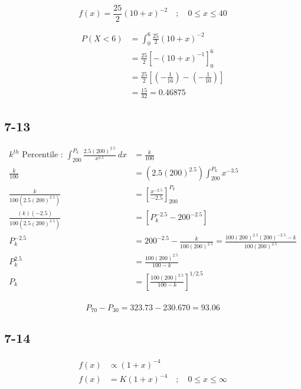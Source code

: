 \documentclass{article}
\begin{document}
			\[
				f(x) = \frac{25}{2} \left( 10 + x \right)^{-2} \quad ; \quad 0 \leq x \leq 40
			\]

			\begin{equation*}
				\begin{split}
					P(X < 6) &= \int_{0}^{6} \frac{25}{2} \left( 10 + x \right)^{-2} \\
					&= \frac{25}{2} \left[ -(10 + x)^{-1} \right]^{6}_0 \\
					&= \frac{25}{2} \left[ \left(-\frac{1}{16}\right) - \left(-\frac{1}{10}\right) \right] \\
					&= \frac{15}{32} = \boxed{\num{0.46875}}
				\end{split}
			\end{equation*}

		\subsection*{7-13}

			\begin{equation*}
				\begin{split}
					k^{th} \text{ Percentile : } \int_{200}^{P_{k}} \frac{2.5 (200)^{2.5}}{x^{3.5}} \ dx &= \frac{k}{100} \\
					\frac{k}{100} &= (2.5 (200)^{2.5}) \int_{200}^{P_{k}} x^{-3.5} \\
					\frac{k}{100(2.5 (200)^{2.5})} &= \left[ \frac{x^{-2.5}}{-2.5} \right]^{P_{k}}_{200} \\
					\frac{(k)(-2.5)}{100(2.5 (200)^{2.5})} &= \left[ P_{k}^{-2.5} - 200^{-2.5} \right] \\
					P_{k}^{-2.5} &= 200^{-2.5} - \frac{k}{100(200)^{2.5}} = \frac{100(200)^{2.5}(200)^{-2.5} - k}{100(200)^{2.5}} \\
					P_{k}^{2.5} &= \frac{100(200)^{2.5}}{100 - k} \\
					P_{k} &= \left[\frac{100(200)^{2.5}}{100 - k}\right]^{1/2.5} \\
				\end{split}
			\end{equation*}

			\[
				P_{70} - P_{30} = 323.73 - 230.670 = \boxed{93.06}
			\]

	\clearpage

		\subsection*{7-14}

			\begin{equation*}
				\begin{split}
					f(x) &\propto \left( 1 + x \right)^{-4} \\
					f(x) &= K \left( 1 + x \right)^{-4} \quad ; \quad 0 \leq x \leq \infty
				\end{split}
			\end{equation*}
\end{document}
